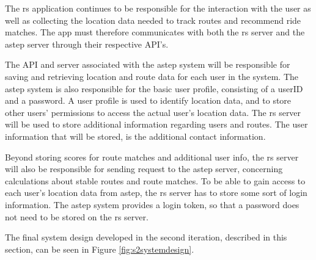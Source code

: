 The \gls{rs} application continues to be responsible for the interaction with the user as well as collecting the location data needed to track routes and recommend ride matches.
The app must therefore communicates with both the \gls{rs} server and the \gls{astep} server through their respective API's.


The API and server associated with the \gls{astep} system will be responsible for saving and retrieving location and route data for each user in the system.
The \gls{astep} system is also responsible for the basic user profile, consisting of a userID and a password.
A user profile is used to identify location data, and to store other users' permissions to access the actual user's location data.
The \gls{rs} server will be used to store additional information regarding users and routes.
The user information that will be stored, is the additional contact information.

Beyond storing scores for route matches and additional user info, the \gls{rs} server will also be responsible for sending request to the \gls{astep} server, concerning calculations about stable routes and route matches.
To be able to gain access to each user's location data from \gls{astep}, the \gls{rs} server has to store some sort of login information.
The \gls{astep} system provides a login token, so that a password does not need to be stored on the \gls{rs} server.


The final system design developed in the second iteration, described in this section, can be seen in Figure \ref{fig:s2systemdesign}.

